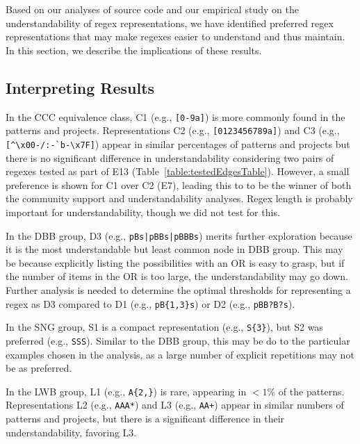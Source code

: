 Based on our analyses of source code and our empirical study on the understandability of regex representations, we have identified preferred regex representations that may make regexes easier to understand and thus maintain. In this section, we describe the implications of these results.

\subsection{Interpreting Results}
In the CCC equivalence class, C1 (e.g., \verb![0-9a]!) is more commonly found in the patterns and projects.  Representations C2 (e.g., \verb![0123456789a]!) and C3 (e.g., \verb![^\x00-/:-`b-\x7F]!) appear in similar percentages of patterns and projects but there is no significant difference in understandability considering two pairs of regexes tested as part of E13 (Table~\ref{table:testedEdgesTable}). However, a small preference is shown for C1 over C2 (E7), leading this to to be the winner of both the community support and understandability analyses.    Regex length is probably important for understandability, though we did not test for this.


In the DBB group, D3 (e.g., \verb!pBs|pBBs|pBBBs!) merits further exploration because it is the most understandable but least common node in DBB group.  This may be because explicitly listing the possibilities with an OR is easy to grasp, but if the number of items in the OR is too large, the understandability may go down. Further analysis is needed to determine the optimal thresholds for representing a regex as D3 compared to D1 (e.g., \verb!pB{1,3}s!) or D2 (e.g., \verb!pBB?B?s!).


In the SNG group, S1 is a compact representation (e.g., \verb!S{3}!), but S2 was preferred (e.g., \verb!SSS!). Similar to the DBB group, this may be do to the particular examples chosen in the analysis, as a large number of explicit repetitions may not be as preferred.

In the LWB group,  L1 (e.g., \verb!A{2,}!) is rare, appearing in $<1$\% of the patterns. Representations L2 (e.g., \verb!AAA*!) and L3 (e.g., \verb!AA+!) appear in similar numbers of patterns and projects, but there is a significant difference in their understandability, favoring L3.

